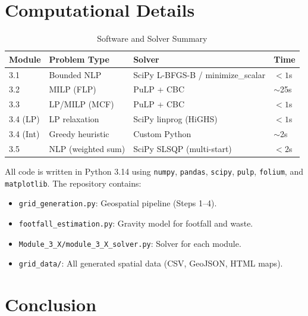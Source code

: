 \documentclass[11pt,a4paper]{article}
\begin{document}
\section{Computational Details}

\begin{table}[H]
\centering
\caption{Software and Solver Summary}
\begin{tabular}{llll}
\toprule
\textbf{Module} & \textbf{Problem Type} & \textbf{Solver} & \textbf{Time} \\ \midrule
3.1 & Bounded NLP & SciPy L-BFGS-B / minimize\_scalar & $< 1$s \\
3.2 & MILP (FLP) & PuLP + CBC & $\sim$25s \\
3.3 & LP/MILP (MCF) & PuLP + CBC & $< 1$s \\
3.4 (LP) & LP relaxation & SciPy linprog (HiGHS) & $< 1$s \\
3.4 (Int) & Greedy heuristic & Custom Python & $\sim$2s \\
3.5 & NLP (weighted sum) & SciPy SLSQP (multi-start) & $< 2$s \\
\bottomrule
\end{tabular}
\end{table}

All code is written in Python 3.14 using \texttt{numpy}, \texttt{pandas}, \texttt{scipy}, \texttt{pulp}, \texttt{folium}, and \texttt{matplotlib}. The repository contains:

\begin{itemize}
    \item \texttt{grid\_generation.py}: Geospatial pipeline (Steps 1--4).
    \item \texttt{footfall\_estimation.py}: Gravity model for footfall and waste.
    \item \texttt{Module\_3\_X/module\_3\_X\_solver.py}: Solver for each module.
    \item \texttt{grid\_data/}: All generated spatial data (CSV, GeoJSON, HTML maps).
\end{itemize}

\section{Conclusion}
\end{document}
